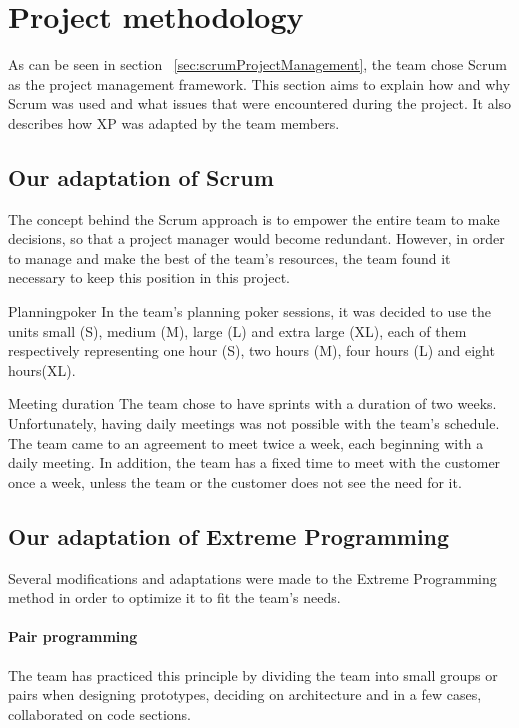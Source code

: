 \section{Project methodology}

\label{sec:scrumDevProcess}
As can be seen in section ~\ref{sec:scrumProjectManagement}, the team chose Scrum as the project management framework. This section aims to explain how and why Scrum was used and what issues that were encountered during the project.  It also describes how XP was adapted by the team members.

\subsection{Our adaptation of Scrum}
The concept behind the Scrum approach is to empower the entire team to make decisions, so that a project manager would become redundant. However, in order to manage and make the best of the team's resources, the team found it necessary to keep this position in this project.


Planningpoker
In the team's planning poker sessions, it was decided to use the units small (S), medium (M), large (L) and extra large (XL), each of them respectively representing one hour (S), two hours (M), four hours (L) and eight hours(XL).

Meeting duration
The team chose to have sprints with a duration of two weeks. Unfortunately, having daily meetings was not possible with the team's schedule. The team came to an agreement to meet twice a week, each beginning with a daily meeting. In addition, the team has a fixed time to meet with the customer once a week, unless the team or the customer does not see the need for it.

\subsection{Our adaptation of Extreme Programming}
Several modifications and adaptations were made to the Extreme Programming method in order to optimize it to fit the team's needs.

\paragraph{Pair programming}
The team has practiced this principle by dividing the team into small groups or pairs when designing prototypes, deciding on architecture and in a few cases, collaborated on code sections.

